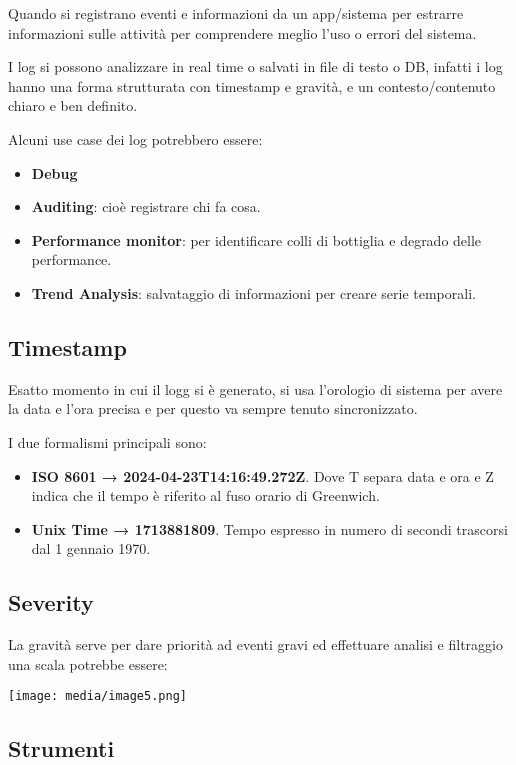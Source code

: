 Quando si registrano eventi e informazioni da un app/sistema per
estrarre informazioni sulle attività per comprendere meglio l'uso o
errori del sistema.

I log si possono analizzare in real time o salvati in file di testo o
DB, infatti i log hanno una forma strutturata con timestamp e gravità, e
un contesto/contenuto chiaro e ben definito.

Alcuni use case dei log potrebbero essere:

\begin{itemize}
\item
  \textbf{Debug}
\item
  \textbf{Auditing}: cioè registrare chi fa cosa.
\item
  \textbf{Performance monitor}: per identificare colli di bottiglia e
  degrado delle performance.
\item
  \textbf{Trend Analysis}: salvataggio di informazioni per creare serie
  temporali.
\end{itemize}

\subsection{Timestamp}\label{timestamp}

Esatto momento in cui il logg si è generato, si usa l'orologio di
sistema per avere la data e l'ora precisa e per questo va sempre tenuto
sincronizzato.

I due formalismi principali sono:

\begin{itemize}
\item
  \textbf{ISO 8601 → 2024-04-23T14:16:49.272Z}. Dove T separa data e ora
  e Z indica che il tempo è riferito al fuso orario di Greenwich.
\item
  \textbf{Unix Time → 1713881809}. Tempo espresso in numero di secondi
  trascorsi dal 1 gennaio 1970.
\end{itemize}

\subsection{Severity}\label{severity}

La gravità serve per dare priorità ad eventi gravi ed effettuare analisi
e filtraggio una scala potrebbe essere:

\texttt{[image: media/image5.png]}

\subsection{Strumenti}\label{strumenti}


